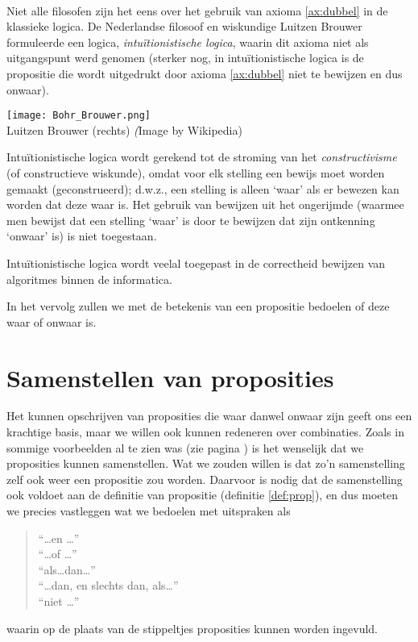 \begin{aside}\mbox{}\\[1em]
Niet alle filosofen zijn het eens over het gebruik van axioma \ref{ax:dubbel} in de klassieke logica. De Nederlandse filosoof en wiskundige Luitzen Brouwer formuleerde een logica, \textit{intu\"itionistische logica}, waarin dit axioma niet als uitgangspunt werd genomen (sterker nog, in intu\-\"itionistische logica is de propositie die wordt uitgedrukt door axioma \ref{ax:dubbel} niet te bewijzen en dus onwaar).

  \begin{marginfigure}
\texttt{[image: Bohr\_Brouwer.png]}\\
    Luitzen Brouwer (rechts) {\scriptsize\emph (Image by Wikipedia)}\\[3mm]
  \end{marginfigure}
 
\hspace{15pt}Intu\"itionistische logica wordt gerekend tot de stroming van het \textit{constructivisme} (of constructieve wiskunde), omdat voor elk stelling een bewijs moet worden gemaakt (geconstrueerd); d.w.z., een stelling is alleen `waar' als er bewezen kan worden dat deze waar is. Het gebruik van bewijzen uit het ongerijmde (waarmee men bewijst dat een stelling `waar' is door te bewijzen dat zijn ontkenning `onwaar' is) is niet toegestaan.

Intu\"itionistische logica wordt veelal toegepast in de correctheid bewijzen van algoritmes binnen de informatica.
\end{aside}

In het vervolg zullen we met de betekenis van een propositie bedoelen of deze waar of onwaar is.

\section{Samenstellen van proposities}\label{sec:samenstelling}
Het kunnen opschrijven van proposities die waar danwel onwaar zijn geeft ons een krachtige basis, maar we willen ook kunnen redeneren over combinaties. Zoals in sommige voorbeelden al te zien was (zie pagina \pageref{q:non:prop}) is het wenselijk dat we proposities kunnen samenstellen. Wat we zouden willen is dat zo'n samenstelling zelf ook weer een propositie zou worden. Daarvoor is nodig dat de samenstelling ook voldoet aan de definitie van propositie (definitie \ref{def:prop}), en dus moeten we precies vastleggen wat we bedoelen met uitspraken als
\begin{quote}
\enquote{\ldots en \ldots}\\
\enquote{\ldots of \ldots}\\
\enquote{als\ldots dan\ldots}\\
\enquote{\ldots dan, en slechts dan, als\ldots}\\
\enquote{niet \ldots}
\end{quote}
waarin op de plaats van de stippeltjes proposities kunnen  worden ingevuld.

